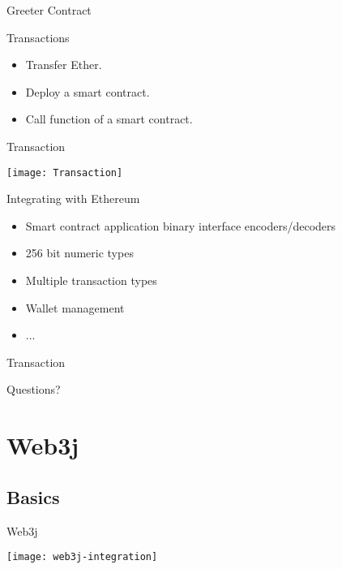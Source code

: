 \documentclass{beamer}
\begin{document}
\begin{frame}{Greeter Contract}
	
\end{frame}

\begin{frame}{Transactions}
	\begin{itemize}
		\item {
			Transfer Ether.
		}
		\item {
			Deploy a smart contract.
		}
		\item {
			Call function of a smart contract.
		}
	\end{itemize}
\end{frame}

\begin{frame}{Transaction}
	\begin{center}
		\texttt{[image: Transaction]}
	\end{center}
\end{frame}

\begin{frame}{Integrating with Ethereum}
	\begin{itemize}
		\item {
			Smart contract application binary interface
			encoders/decoders
		}
		\item {
			256 bit numeric types
		}
		\item {
			Multiple transaction types
		}
		\item {
			Wallet management
		}
		\item {
			...
		}
	\end{itemize}
\end{frame}

\begin{frame}{Transaction}
	\begin{center}
		Questions?
	\end{center}
\end{frame}

\section{Web3j}

\subsection{Basics}

\begin{frame}{Web3j}
	\begin{center}
		\texttt{[image: web3j-integration]}
	\end{center}
\end{frame}
\end{document}
